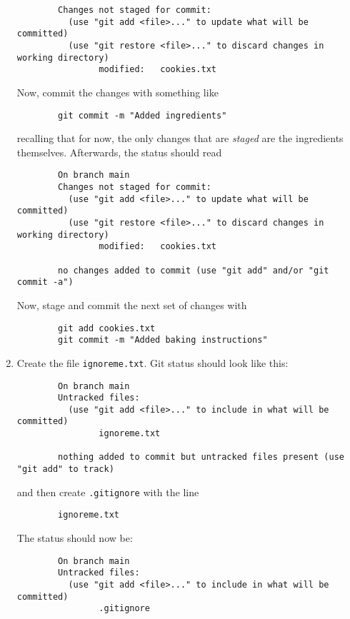 \begin{enumerate}
\begin{verbatim}
        Changes not staged for commit:
          (use "git add <file>..." to update what will be committed)
          (use "git restore <file>..." to discard changes in working directory)
                modified:   cookies.txt
        \end{verbatim}
        Now, commit the changes with something like
        \begin{verbatim}
        git commit -m "Added ingredients"
        \end{verbatim}
        recalling that for now, the only changes that are \emph{staged} are
        the ingredients themselves.
        Afterwards, the status should read
        \begin{verbatim}
        On branch main
        Changes not staged for commit:
          (use "git add <file>..." to update what will be committed)
          (use "git restore <file>..." to discard changes in working directory)
                modified:   cookies.txt

        no changes added to commit (use "git add" and/or "git commit -a")
        \end{verbatim}
        Now, stage and commit the next set of changes with
        \begin{verbatim}
        git add cookies.txt
        git commit -m "Added baking instructions"
        \end{verbatim}
    \item Create the file \verb+ignoreme.txt+. 
        Git status should look like this:
        \begin{verbatim}
        On branch main
        Untracked files:
          (use "git add <file>..." to include in what will be committed)
                ignoreme.txt

        nothing added to commit but untracked files present (use "git add" to track)
        \end{verbatim}
        and then create
        \verb+.gitignore+ with the line
        \begin{verbatim}
        ignoreme.txt
        \end{verbatim}
        The status should now be:
        \begin{verbatim}
        On branch main
        Untracked files:
          (use "git add <file>..." to include in what will be committed)
                .gitignore


\end{verbatim}
\end{enumerate}
